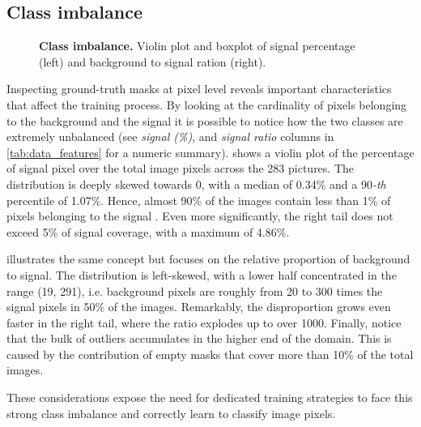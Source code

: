 \subsection{Class imbalance}
\label{sec:class_imbalance}
\begin{figure}
    \centering
    \caption{\textbf{Class imbalance.} Violin plot and boxplot of signal percentage (left) and background to signal ration (right).}
    \label{fig:dataset:class_imbalance}
\end{figure}

Inspecting ground-truth masks at pixel level reveals important characteristics that affect the training process. 
By looking at the cardinality of pixels belonging to the background and the signal it is possible to notice how the two classes are extremely unbalanced (see \textit{signal (\%)}, and \textit{signal ratio} columns in \cref{tab:data_features} for a numeric summary).
 shows a violin plot of the percentage of signal pixel over the total image pixels across the 283 pictures.
The distribution is deeply skewed towards 0, with a median of 0.34\% and a 90\emph{-th} percentile of 1.07\%. 
Hence, almost 90\% of the images contain less than 1\% of pixels belonging to the signal%
.
Even more significantly, the right tail does not exceed 5\% of signal coverage, with a maximum of 4.86\%.

 illustrates the same concept but focuses on the relative proportion of background to signal. 
The distribution is left-skewed, with a lower half concentrated in the range (19, 291), i.e. background pixels are roughly from 20 to 300 times the signal pixels in 50\% of the images.
Remarkably, the disproportion grows even faster in the right tail, where the ratio explodes up to over 1000. 
Finally, notice that the bulk of outliers accumulates in the higher end of the domain. 
This is caused by the contribution of empty masks that cover more than 10\% of the total images.

These considerations expose the need for dedicated training strategies to face this strong class imbalance and correctly learn to classify image pixels.